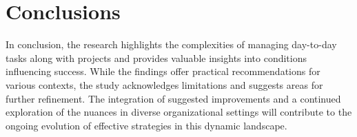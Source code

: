 \documentclass{chart}
\begin{document}
 \section{Conclusions}
In conclusion, the research highlights the complexities of managing day-to-day tasks along with projects and provides valuable insights into conditions influencing success. While the findings offer practical recommendations for various contexts, the study acknowledges limitations and suggests areas for further refinement. The integration of suggested improvements and a continued exploration of the nuances in diverse organizational settings will contribute to the ongoing evolution of effective strategies in this dynamic landscape.







 
\end{document}
